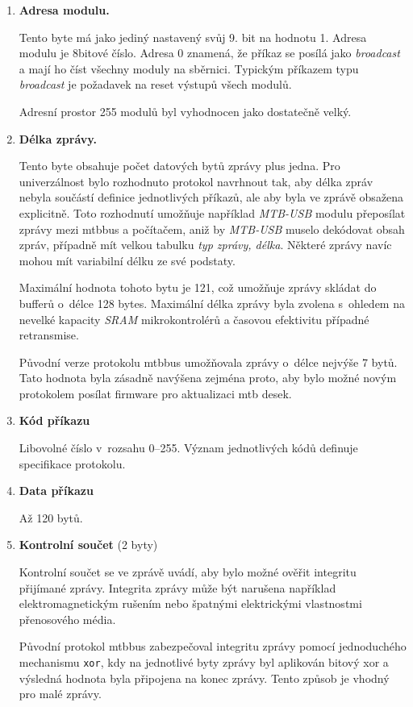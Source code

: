 \begin{enumerate}
\item \textbf{Adresa modulu.}

Tento byte má jako jediný nastavený svůj 9. bit na hodnotu 1.
Adresa modulu je 8bitové číslo. Adresa 0 znamená, že příkaz se posílá
jako \textit{broadcast} a mají ho číst všechny moduly na sběrnici. Typickým
příkazem typu \textit{broadcast} je požadavek na reset výstupů všech modulů.

Adresní prostor 255 modulů byl vyhodnocen jako dostatečně velký.

\item \textbf{Délka zprávy.}

Tento byte obsahuje počet datových bytů zprávy plus jedna. Pro univerzálnost bylo
rozhodnuto protokol navrhnout tak, aby délka zpráv nebyla součástí definice
jednotlivých příkazů, ale aby byla ve zprávě obsažena explicitně. Toto
rozhodnutí umožňuje například \textit{MTB-USB} modulu přeposílat zprávy mezi
\gls{mtbbus} a počítačem, aniž by \textit{MTB-USB} muselo dekódovat obsah
zpráv, případně mít velkou tabulku \textit{typ zprávy, délka}. Některé zprávy
navíc mohou mít variabilní délku ze své podstaty.

Maximální hodnota tohoto bytu je 121, což umožňuje zprávy skládat do bufferů
o~délce 128 bytes. Maximální délka zprávy byla zvolena s~ohledem na nevelké
kapacity \textit{SRAM} mikrokontrolérů a časovou efektivitu případné
retransmise.

Původní verze protokolu \gls{mtbbus} umožňovala zprávy o~délce nejvýše 7 bytů.
Tato hodnota byla zásadně navýšena zejména proto, aby bylo možné novým
protokolem posílat firmware pro aktualizaci \gls{mtb} desek.

\item \textbf{Kód příkazu}

Libovolné číslo v~rozsahu 0–255. Význam jednotlivých kódů definuje specifikace
protokolu.

\item \textbf{Data příkazu}

Až 120 bytů.

\item \textbf{Kontrolní součet} (2 byty)

Kontrolní součet se ve zprávě uvádí, aby bylo možné ověřit integritu přijímané
zprávy. Integrita zprávy může být narušena například elektromagnetickým rušením
nebo špatnými elektrickými vlastnostmi přenosového média.

Původní protokol \gls{mtbbus} zabezpečoval integritu zprávy pomocí jednoduchého
mechanismu \texttt{xor}, kdy na jednotlivé byty zprávy byl aplikován bitový xor
a výsledná hodnota byla připojena na konec zprávy. Tento způsob je vhodný pro
malé zprávy.


\end{enumerate}
